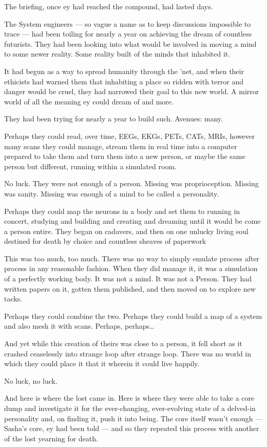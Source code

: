 The briefing, once ey had reached the compound, had lasted days.

The System engineers — so vague a name as to keep discussions impossible to trace — had been toiling for nearly a year on achieving the dream of countless futurists. They had been looking into what would be involved in moving a mind to some newer reality. Some reality built of the minds that inhabited it.

It had begun as a way to spread humanity through the 'net, and when their ethicists had warned them that inhabiting a place so ridden with terror and danger would be cruel, they had narrowed their goal to this new world. A mirror world of all the meaning ey could dream of and more.

They had been trying for nearly a year to build such. Avenues: many.

Perhaps they could read, over time, EEGs, EKGs, PETs, CATs, MRIs, however many scans they could manage, stream them in real time into a computer prepared to take them and turn them into a new person, or maybe the same person but different, running within a simulated room.

No luck. They were not enough of a person. Missing was proprioception. Missing was sanity. Missing was enough of a mind to be called a personality.

Perhaps they could map the neurons in a body and set them to running in concert, studying and building and creating and dreaming until it would be come a person entire. They began on cadavers, and then on one unlucky living soul destined for death by choice and countless sheaves of paperwork

This was too much, too much. There was no way to simply emulate process after process in any reasonable fashion. When they did manage it, it was a simulation of a perfectly working body. It was not a mind. It was not a Person. They had written papers on it, gotten them published, and then moved on to explore new tacks.

Perhaps they could combine the two. Perhaps they could build a map of a system and also mesh it with scans. Perhaps, perhaps\ldots{}

And yet while this creation of theirs was close to a person, it fell short as it crashed ceaselessly into strange loop after strange loop. There was no world in which they could place it that it wherein it could live happily.

No luck, no luck.

And here is where the lost came in. Here is where they were able to take a core dump and investigate it for the ever-changing, ever-evolving state of a delved-in personality and, on finding it, push it into being. The core itself wasn't enough — Sasha's core, ey had been told — and so they repeated this process with another of the lost yearning for death.


